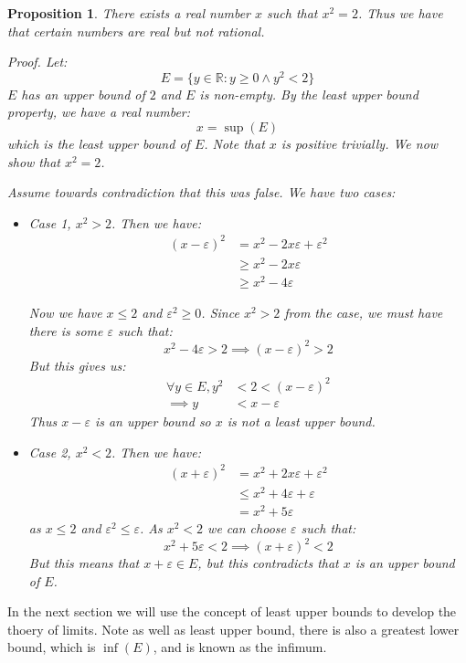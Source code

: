 \documentclass{article}
\newtheorem{proposition}{Proposition}[subsection]
\newcommand{\R}{\mathbb{R}}
\newcommand{\vep}{\varepsilon} %
\let\it\textit
\begin{document}
\begin{proposition}
	There exists a real number $x$ such that	
	$x^2 = 2$. Thus we have that 
	certain numbers are real but not rational. 


	\it{Proof}. Let:
	$$
	E = \{y \in \R : y \geq 0 \land y^2 < 2\}
	$$
	$E$ has an upper bound of $2$ and 
	$E$ is non-empty. By the least 
	upper bound property, we
	have a real number:
	$$
	x = \sup(E)
	$$
	which is the least upper bound of $E$. 
	Note that $x$ is positive trivially.
	We now show that $x^2 = 2$.

	Assume towards contradiction that this
	was false. We have two cases: 
	\begin{itemize}
		\item Case 1, $x^2 > 2$. Then 
			we have: 
			\begin{align*}
			(x - \vep)^2 &= x^2 - 2x\vep + \vep^2 \\ 
				     &\geq x^2 - 2x\vep \\ 
				     &\geq x^2 - 4\vep
			\end{align*}

		Now we have $x \leq 2$ and $\vep^2 \geq 0$. 
		Since $x^2 > 2$ from the case, we must 
		have there is some $\vep$ such that:
		$$
		x^2 - 4\vep > 2 \implies (x - \vep)^2 > 2
		$$
		But this gives us: 
		\begin{align*}
			\forall y \in E, y^2 &< 2 < (x - \vep)^2 \\ 
			\implies y &< x - \vep
		\end{align*}
		Thus $x - \vep$ is an upper bound so 
		$x$ is not a least upper bound.

		\item Case 2, $x^2 < 2$. Then 
			we have: 
			\begin{align*}
			(x + \vep)^2 &= x^2 + 2x\vep + \vep^2 \\ 
				     &\leq x^2  + 4 \vep + \vep  \\ 
				     &= x^2 + 5 \vep 
			\end{align*}
			as $x \leq 2$ and $\vep^2 \leq \vep$. 
			As $x^2 < 2$ we can choose $\vep$ such 
			that: 
			$$
			x^2 + 5\vep < 2 \implies (x + \vep)^2 < 2
			$$
			But this means that $x + \vep \in E$, but 
			this contradicts that $x$ is an upper bound
			of $E$.
	\end{itemize}
\end{proposition}

In the next section we will use the concept of least upper
bounds to develop the thoery of limits. Note 
as well as least upper bound, there is also 
a greatest lower bound, which is $\inf(E)$, 
and is known as the infimum.
\end{document}
